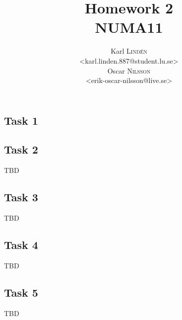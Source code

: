 \documentclass[a4paper,12pt]{article}
\begin{document}
\title{Homework 2 \\ NUMA11}
\author{
  Karl \textsc{Lind\'{e}n} \\
  <karl.linden.887@student.lu.se> \\
  Oscar \textsc{Nilsson} \\
  <erik-oscar-nilsson@live.se>
}

\maketitle
\thispagestyle{empty}

\newpage

\subsection*{Task 1}


\subsection*{Task 2}

TBD

\subsection*{Task 3}

TBD

\subsection*{Task 4}

TBD

\subsection*{Task 5}

TBD
\end{document}
